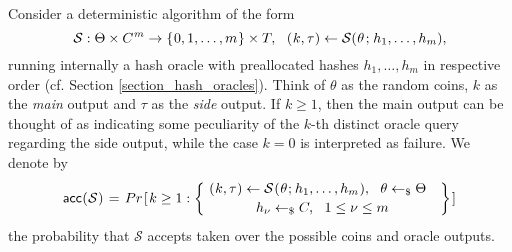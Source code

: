 \documentclass{iacrtrans}
\begin{document}
Consider a deterministic algorithm of the form
\vspace{5pt}
\begin{equation}\label{local_forking_s_form}
\mathcal{S}: \Theta \times C^{\hspace{0.5pt}m} \rightarrow
\{\hspace{0.5pt}0, 1, \dots, m\hspace{0.5pt}\} \times T,
\ \ (
	\hspace{0.5pt}
	k,
	\tau
	\hspace{0.2pt}
)
\leftarrow
\mathcal{S}(
	\hspace{0.4pt}
	\theta
	\hspace{1pt}
	;
	\hspace{1pt}
	h_1,
	\dots,
	h_m
	\hspace{0.0pt}
),
\vspace{5pt}
\end{equation}
running internally a hash oracle
with preallocated hashes $h_1, \dots, h_m$
in respective order (cf. Section \ref{section_hash_oracles}).
Think of $\theta$ as the random coins,
$k$ as the \textit{main} output and
$\tau$ as the \textit{side} output.
If $k \ge 1$, then the main output can be thought of as indicating
some peculiarity of the $k$-th distinct
oracle query regarding the side output,
while the case $k = 0$ is interpreted as failure.
We denote by
\vspace{6pt}
\begin{equation}\label{local_forking_acc}
\mathsf{acc}
	\hspace{0.3pt}
	(
		\hspace{0.3pt}
		\mathcal{S}
		\hspace{0.3pt}
	)
\hspace{1pt}
=
\hspace{1pt}
Pr\hspace{1pt}[\hspace{1pt}k \ge 1 :
\begin{Bmatrix}
\ (
	\hspace{0.4pt}
	k,
	\tau
	\hspace{0.2pt}
)
\leftarrow
\mathcal{S}
	\hspace{0.5pt}
	(
		\hspace{0.5pt}
		\theta
		\hspace{0.5pt}
		;
		\hspace{0.5pt}
		h_1,
		\dots,
		h_m
		\hspace{0.5pt}
	),
\ \ \theta \leftarrow_\$ \Theta\ \ \ \\[2pt]
h_\nu \leftarrow_\$ C,
\ \ 1 \le \nu \le m
\end{Bmatrix}
\hspace{1pt}]\\[6pt]
\end{equation}
the probability that $\mathcal{S}$ accepts
taken over the possible coins and oracle outputs.
\end{document}
